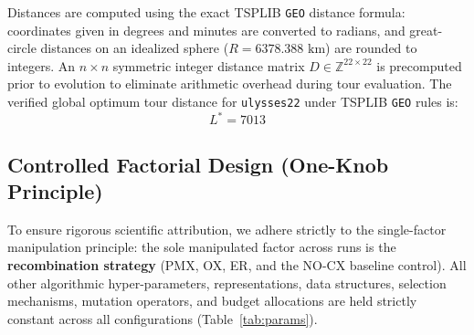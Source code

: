 \documentclass[10pt,a4paper]{article}
\begin{document}
Distances are computed using the exact TSPLIB \texttt{GEO} distance formula: coordinates given in degrees and minutes are converted to radians, and great-circle distances on an idealized sphere ($R = 6378.388\text{ km}$) are rounded to integers. An $n \times n$ symmetric integer distance matrix $D \in \mathbb{Z}^{22 \times 22}$ is precomputed prior to evolution to eliminate arithmetic overhead during tour evaluation. The verified global optimum tour distance for \texttt{ulysses22} under TSPLIB \texttt{GEO} rules is:
\begin{equation}
L^* = 7013
\end{equation}

\subsection{Controlled Factorial Design (One-Knob Principle)}

To ensure rigorous scientific attribution, we adhere strictly to the single-factor manipulation principle: the sole manipulated factor across runs is the \textbf{recombination strategy} (PMX, OX, ER, and the NO-CX baseline control). All other algorithmic hyper-parameters, representations, data structures, selection mechanisms, mutation operators, and budget allocations are held strictly constant across all configurations (Table~\ref{tab:params}).
\end{document}
